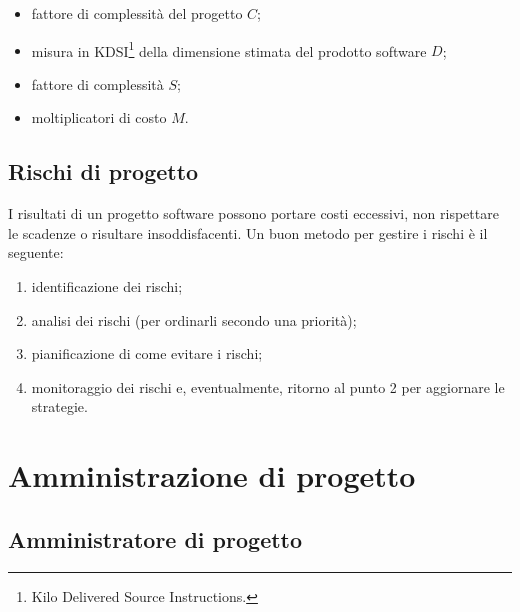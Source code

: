 \documentclass[a4paper]{article}
\begin{document}
	\begin{itemize}
		
			
	\item fattore di complessità del progetto $C$;
			
	\item misura in KDSI\footnote{Kilo Delivered Source Instructions.} della dimensione stimata del prodotto software $D$;
			
	\item fattore di complessità $S$;
			
	\item moltiplicatori di costo $M$.
		
	\end{itemize}


		
	\subsection{Rischi di progetto}

		
I risultati di un progetto software possono portare costi eccessivi, non rispettare le scadenze o risultare insoddisfacenti. Un buon metodo per gestire i rischi è il seguente:
		
	\begin{enumerate}
		
			
	\item identificazione dei rischi;
			
	\item analisi dei rischi (per ordinarli secondo una priorità);
			
	\item pianificazione di come evitare i rischi;
			
	\item monitoraggio dei rischi e, eventualmente, ritorno al punto 2 per aggiornare le strategie.
		
	\end{enumerate}

	


		
	\section{Amministrazione di progetto}


		
	\subsection{Amministratore di progetto}
\end{document}
